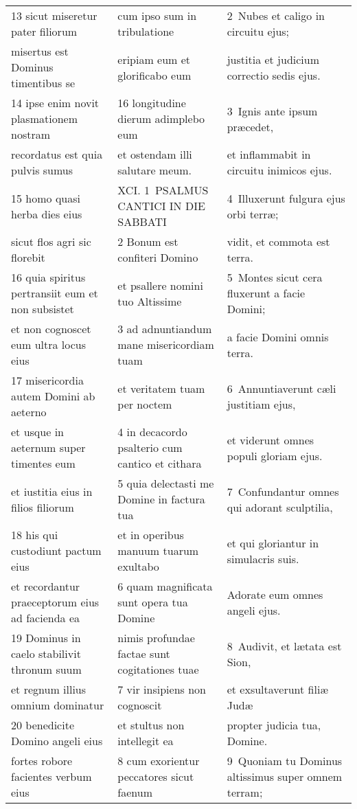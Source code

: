 \documentclass{article}
\begin{document}
\begin{longtable}{@{}p{}p{}p{}@{}}
13 sicut miseretur pater filiorum	&	cum ipso sum in tribulatione	&	2 Nubes et caligo in circuitu ejus;	\\
misertus est Dominus timentibus se	&	eripiam eum et glorificabo eum	&	justitia et judicium correctio sedis ejus.	\\
14 ipse enim novit plasmationem nostram	&	16 longitudine dierum adimplebo eum	&	3 Ignis ante ipsum præcedet,	\\
recordatus est quia pulvis sumus	&	et ostendam illi salutare meum.	&	et inflammabit in circuitu inimicos ejus.	\\
15 homo quasi herba dies eius	&	XCI. 1 PSALMUS CANTICI IN DIE SABBATI	&	4 Illuxerunt fulgura ejus orbi terræ;	\\
sicut flos agri sic florebit	&	2 Bonum est confiteri Domino	&	vidit, et commota est terra.	\\
16 quia spiritus pertransiit eum et non subsistet	&	et psallere nomini tuo Altissime	&	5 Montes sicut cera fluxerunt a facie Domini;	\\
et non cognoscet eum ultra locus eius	&	3 ad adnuntiandum mane misericordiam tuam	&	a facie Domini omnis terra.	\\
17 misericordia autem Domini ab aeterno	&	et veritatem tuam per noctem	&	6 Annuntiaverunt cæli justitiam ejus,	\\
et usque in aeternum super timentes eum	&	4 in decacordo psalterio cum cantico et cithara	&	et viderunt omnes populi gloriam ejus.	\\
et iustitia eius in filios filiorum	&	5 quia delectasti me Domine in factura tua	&	7 Confundantur omnes qui adorant sculptilia,	\\
18 his qui custodiunt pactum eius	&	et in operibus manuum tuarum exultabo	&	et qui gloriantur in simulacris suis.	\\
et recordantur praeceptorum eius ad facienda ea	&	6 quam magnificata sunt opera tua Domine	&	Adorate eum omnes angeli ejus.	\\
19 Dominus in caelo stabilivit thronum suum	&	nimis profundae factae sunt cogitationes tuae	&	8 Audivit, et lætata est Sion,	\\
et regnum illius omnium dominatur	&	7 vir insipiens non cognoscit	&	et exsultaverunt filiæ Judæ	\\
20 benedicite Domino angeli eius	&	et stultus non intellegit ea	&	propter judicia tua, Domine.	\\
fortes robore facientes verbum eius	&	8 cum exorientur peccatores sicut faenum	&	9 Quoniam tu Dominus altissimus super omnem terram;	\\

\end{longtable}
\end{document}
